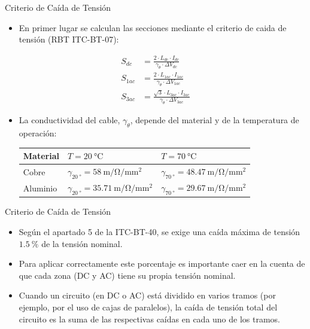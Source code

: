 \documentclass[aspectratio=169, usenames,svgnames,dvipsnames]{beamer}
\begin{document}
\begin{frame}[label={sec:org89b690d}]{Criterio de Caída de Tensión}
\begin{itemize}
\item En primer lugar se calculan las secciones mediante el criterio de caida de tensión (RBT ITC-BT-07):
\end{itemize}
\begin{align*}
    S_{dc} &=  \frac{2 \cdot L_{dc}\cdot I_{dc}}{\gamma_\theta \cdot \Delta V_{dc}}\\
    S_{1ac} &=  \frac{2\cdot L_{1ac}\cdot I_{1ac}}{\gamma_\theta \cdot \Delta V_{1ac}}\\
    S_{3ac} &= \frac{\sqrt{3} \cdot L_{3ac}\cdot I_{3ac}}{\gamma_\theta \cdot \Delta V_{3ac}}
  \end{align*}

\begin{itemize}
\item La conductividad del cable, \(\gamma_\theta\), depende del material y de la
temperatura de operación:

\begin{center}
\begin{tabular}{lll}
Material & \(T = \qty{20}{\celsius}\) & \(T = \qty{70}{\celsius}\)\\[0pt]
\hline
Cobre & \(\gamma_{\qty{20}{\degree}} = \qty{58}{\meter\per\ohm\per\milli\meter\squared}\) & \(\gamma_{\qty{70}{\degree}} = \qty{48,47}{\meter\per\ohm\per\milli\meter\squared}\)\\[0pt]
Aluminio & \(\gamma_{\qty{20}{\degree}} = \qty{35,71}{\meter\per\ohm\per\milli\meter\squared}\) & \(\gamma_{\qty{70}{\degree}} = \qty{29,67}{\meter\per\ohm\per\milli\meter\squared}\)\\[0pt]
\end{tabular}
\end{center}
\end{itemize}
\end{frame}

\begin{frame}[label={sec:org1e89967}]{Criterio de Caída de Tensión}
\begin{itemize}
\item Según el apartado 5 de la ITC-BT-40, se exige una caída máxima de
tensión \(\qty{1.5}{\percent}\) de la tensión nominal.

\item Para aplicar correctamente este porcentaje es importante caer en la
cuenta de que \alert{cada zona (DC y AC) tiene su propia tensión nominal}.

\item Cuando un circuito (en DC o AC) está dividido en varios tramos (por
ejemplo, por el uso de cajas de paralelos), la caída de tensión
total del circuito es la suma de las respectivas caídas en cada uno
de los tramos.
\end{itemize}
\end{frame}
\end{document}

